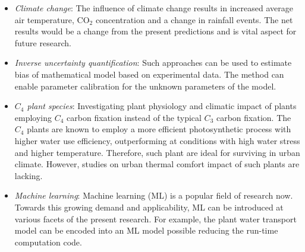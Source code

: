 \begin{itemize}
	\item \textit{Climate change}: The influence of climate change results in increased average air temperature, CO$_2$ concentration and a change in rainfall events. The net results would be a change from the present predictions and is vital aspect for future research.
	
	\item \textit{Inverse uncertainty quantification}: Such approaches can be used to estimate bias of mathematical model based on experimental data. The method can enable parameter calibration for the unknown parameters of the model.  
	
	\item \textit{$C_4$ plant species}:	Investigating plant physiology and climatic impact of plants employing $C_4$ carbon fixation instead of the typical $C_3$ carbon fixation. The $C_4$ plants are known to employ a more efficient photosynthetic process with higher water use efficiency, outperforming at conditions with high water stress and higher temperature. Therefore, such plant are ideal for surviving in urban climate. However, studies on urban thermal comfort impact of such plants are lacking.
	
	\item \textit{Machine learning}: Machine learning (ML) is a popular field of research now. Towards this growing demand and applicability, ML can be introduced at various facets of the present research. For example, the plant water transport model can be encoded into an ML model possible reducing the run-time computation code. 
\end{itemize}